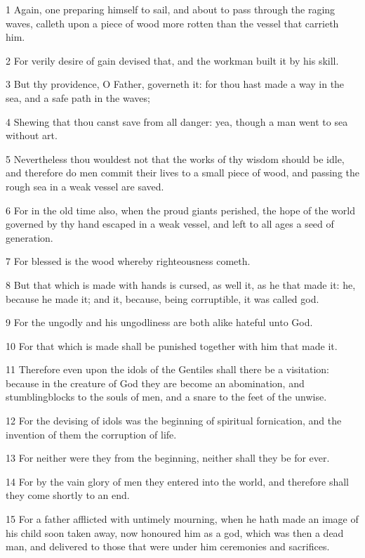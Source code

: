 \par 1 Again, one preparing himself to sail, and about to pass through the raging waves, calleth upon a piece of wood more rotten than the vessel that carrieth him.
\par 2 For verily desire of gain devised that, and the workman built it by his skill.
\par 3 But thy providence, O Father, governeth it: for thou hast made a way in the sea, and a safe path in the waves;
\par 4 Shewing that thou canst save from all danger: yea, though a man went to sea without art.
\par 5 Nevertheless thou wouldest not that the works of thy wisdom should be idle, and therefore do men commit their lives to a small piece of wood, and passing the rough sea in a weak vessel are saved.
\par 6 For in the old time also, when the proud giants perished, the hope of the world governed by thy hand escaped in a weak vessel, and left to all ages a seed of generation.
\par 7 For blessed is the wood whereby righteousness cometh.
\par 8 But that which is made with hands is cursed, as well it, as he that made it: he, because he made it; and it, because, being corruptible, it was called god.
\par 9 For the ungodly and his ungodliness are both alike hateful unto God.
\par 10 For that which is made shall be punished together with him that made it.
\par 11 Therefore even upon the idols of the Gentiles shall there be a visitation: because in the creature of God they are become an abomination, and stumblingblocks to the souls of men, and a snare to the feet of the unwise.
\par 12 For the devising of idols was the beginning of spiritual fornication, and the invention of them the corruption of life.
\par 13 For neither were they from the beginning, neither shall they be for ever.
\par 14 For by the vain glory of men they entered into the world, and therefore shall they come shortly to an end.
\par 15 For a father afflicted with untimely mourning, when he hath made an image of his child soon taken away, now honoured him as a god, which was then a dead man, and delivered to those that were under him ceremonies and sacrifices.
